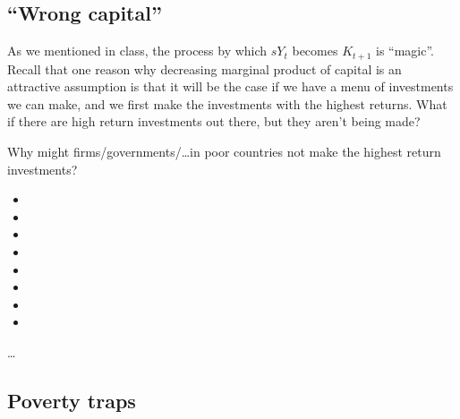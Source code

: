 \documentclass[12pt,english]{article}
\begin{document}
\subsection{``Wrong capital''}

As we mentioned in class, the process by which $sY_{t}$ becomes $K_{t + 1}$ is ``magic''. Recall that one reason why decreasing marginal product of capital is an attractive assumption is that it will be the case if we have a menu of investments we can make, and we first make the investments with the highest returns. What if there are high return investments out there, but they aren't being made?

Why might firms/governments/\ldots in poor countries not make the highest return investments?
\begin{itemize}
	\item 
	\item
	\item
	\item
	\item
	\item
	\item
	\item
\end{itemize}

\ldots

\subsection{Poverty traps}
\end{document}
